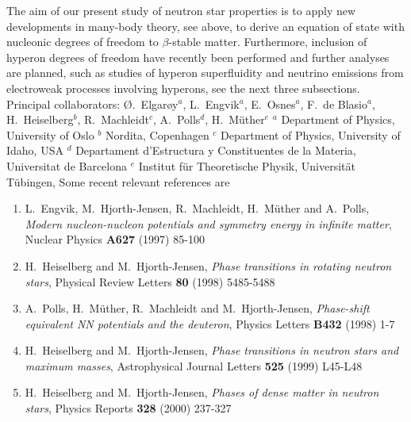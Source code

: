 The aim of our present study of neutron star
properties is to apply new
developments in many-body theory, see above,
to derive an equation of state with nucleonic degrees of freedom to
$\beta$-stable matter. Furthermore, inclusion of hyperon 
degrees of freedom have recently been performed and further analyses
are planned, such as studies of hyperon superfluidity and 
neutrino emissions from electroweak processes involving
hyperons, see the next three subsections.
\newline
\newline
Principal collaborators: \O.\ Elgar\o y$^a$,
L.\ Engvik$^a$, E.\ Osnes$^a$, F.\ de Blasio$^a$,
H.\ Heiselberg$^b$, R.\ Machleidt${}^c$, A.\ Polls${}^d$,  
H.\ M\"uther${}^e$\newline
${}^a$ Department of Physics,
University of Oslo\newline
${}^b$ Nordita, Copenhagen\newline
${}^c$ Department of Physics,
University of Idaho, USA\newline
${}^{d}$ Departament d'Estructura y Constituentes de la Materia,
Universitat de Barcelona\newline
${}^e$ Institut f\"{u}r Theoretische Physik,
Universit\"{a}t T\"{u}bingen,\newline\newline
Some recent relevant references are
\begin{enumerate}
\item    
    L.\ Engvik, M.\ Hjorth-Jensen, R.\ Machleidt, H.\ M\"uther and
    A.\ Polls,
    {\em Modern nucleon-nucleon potentials and symmetry energy in infinite
         matter},
    Nuclear Physics {\bf A627} (1997) 85-100
\item 
    H.\ Heiselberg and M.\ Hjorth-Jensen,
    {\em Phase transitions in rotating  neutron stars}, 
    Physical Review Letters {\bf 80} (1998) 5485-5488
\item    
    A.\ Polls, H.\ M\"uther, R.\ Machleidt and
    M.\ Hjorth-Jensen, 
    {\em Phase-shift equivalent NN potentials and the deuteron},
    Physics Letters {\bf B432} (1998) 1-7
\item 
        H.\ Heiselberg and M.\ Hjorth-Jensen,
    {\em Phase transitions in neutron stars and maximum masses}, 
    Astrophysical Journal Letters {\bf 525} (1999) L45-L48
\item 
    H.\ Heiselberg and M.\ Hjorth-Jensen,
    {\em Phases of dense matter in neutron stars}, 
    Physics Reports {\bf 328} (2000) 237-327

\end{enumerate}


